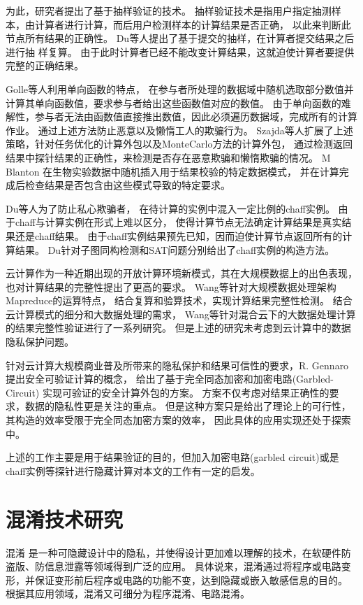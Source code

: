 为此，研究者提出了基于抽样验证的技术。
抽样验证技术是指用户指定抽测样本，由计算者进行计算，而后用户检测样本的计算结果是否正确，
以此来判断此节点所有结果的正确性。
Du等人提出了基于提交的抽样，在计算者提交结果之后进行抽
样复算。
由于此时计算者已经不能改变计算结果，这就迫使计算者要提供完整的正确结果。

Golle等人利用单向函数的特点，
在参与者所处理的数据域中随机选取部分数值并计算其单向函数值，要求参与者给出这些函数值对应的数值。
由于单向函数的难解性，参与者无法由函数值直接推出数值，因此必须遍历数据域，完成所有的计算作业。
通过上述方法防止恶意以及懒惰工人的欺骗行为。
Szajda等人扩展了上述策略，针对任务优化的计算外包以及MonteCarlo方法的计算外包，
通过检测返回结果中探针结果的正确性，来检测是否存在恶意欺骗和懒惰欺骗的情况。
M Blanton 在生物实验数据中随机插入用于结果校验的特定数据模式，
并在计算完成后检查结果是否包含由这些模式导致的特定要求。

Du等人为了防止私心欺骗者，
在待计算的实例中混入一定比例的chaff实例。
由于chaff与计算实例在形式上难以区分，
使得计算节点无法确定计算结果是真实结果还是chaff结果。
由于chaff实例结果预先已知，因而迫使计算节点返回所有的计算结果。
Du针对子图同构检测和SAT问题分别给出了chaff实例的构造方法。

云计算作为一种近期出现的开放计算环境新模式，其在大规模数据上的出色表现，也对计算结果的完整性提出了更高的要求。
Wang等针对大规模数据处理架构Mapreduce的运算特点，
结合复算和验算技术，实现计算结果完整性检测。
结合云计算模式的细分和大数据处理的需求，
Wang等针对混合云下的大数据处理计算的结果完整性验证进行了一系列研究。
但是上述的研究未考虑到云计算中的数据隐私保护问题。

针对云计算大规模商业普及所带来的隐私保护和结果可信性的要求，R. Gennaro提出安全可验证计算的概念，
给出了基于完全同态加密和加密电路(Garbled-Circuit)
实现可验证的安全计算外包的方案。
方案不仅考虑对结果正确性的要求，数据的隐私性更是关注的重点。
但是这种方案只是给出了理论上的可行性，其构造的效率受限于完全同态加密方案的效率，
因此具体的应用实现还处于探索中。

上述的工作主要是用于结果验证的目的，但加入加密电路(garbled circuit)或是chaff实例等探针进行隐藏计算对本文的工作有一定的启发。

\section{混淆技术研究}
混淆
是一种可隐藏设计中的隐私，并使得设计更加难以理解的技术，在软硬件防盗版、防信息泄露等领域得到广泛的应用。
具体说来，混淆通过将程序或电路变形，并保证变形前后程序或电路的功能不变，达到隐藏或嵌入敏感信息的目的。
根据其应用领域，混淆又可细分为程序混淆、电路混淆。


